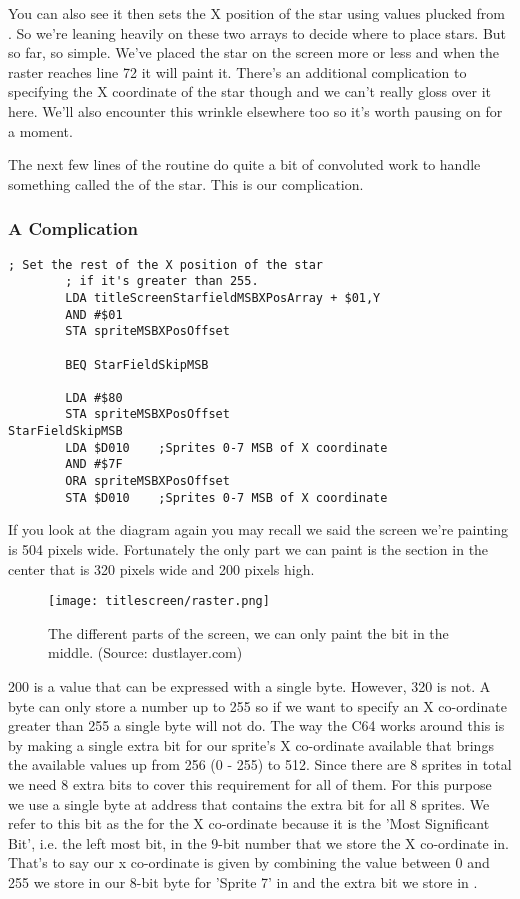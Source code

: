 You can also see it then sets the X position of the star using values plucked from .
So we're leaning heavily on these two arrays to decide where to place stars. But so far, so simple. We've placed the star
on the screen more or less and when the raster reaches line 72 it will paint it. There's an additional complication to 
specifying the X coordinate of the star though and we can't really gloss over it here. We'll also encounter this
wrinkle elsewhere too so it's worth pausing on for a moment.

The next few lines of the routine do quite a bit of convoluted work to handle something called the  of the
star. This is our complication. 

\subsubsection{A Complication}
\begin{lstlisting}[caption= MSBXPos.. some'it.]
        ; Set the rest of the X position of the star
        ; if it's greater than 255.
        LDA titleScreenStarfieldMSBXPosArray + $01,Y
        AND #$01
        STA spriteMSBXPosOffset

        BEQ StarFieldSkipMSB

        LDA #$80
        STA spriteMSBXPosOffset
StarFieldSkipMSB   
        LDA $D010    ;Sprites 0-7 MSB of X coordinate
        AND #$7F
        ORA spriteMSBXPosOffset
        STA $D010    ;Sprites 0-7 MSB of X coordinate

\end{lstlisting}

If you look at the diagram again you may recall we said the screen we're painting is 504 pixels wide. Fortunately the only 
part we can paint is the section in the center that is 320 pixels wide and 200 pixels high. 

\begin{figure}[H]
    \centering
      \texttt{[image: titlescreen/raster.png]}%
  \caption{The different parts of the screen, we can only paint the bit in the middle. (Source: dustlayer.com)}
\end{figure}

200 is a value that can be expressed with a single byte. However, 320 is not. A byte can only store a number up to 255
so if we want to specify an X co-ordinate greater than 255 a single byte will not do. The way the C64 works around this
is by making a single extra bit for our sprite's X co-ordinate available that brings the available values up from 256
(0 - 255) to 512. Since there are 8 sprites in total we need 8 extra bits to cover this requirement for all of them.
For this purpose we use a single byte at address  that contains the extra bit for all 8 sprites. We refer
to this bit as the  for the X co-ordinate because it is the 'Most Significant Bit', i.e. the left most bit,
in the 9-bit number that we store the X co-ordinate in. That's to say our x co-ordinate is given by combining the value
between 0 and 255 we store in our 8-bit byte for 'Sprite 7' in  and the extra bit we store in .

